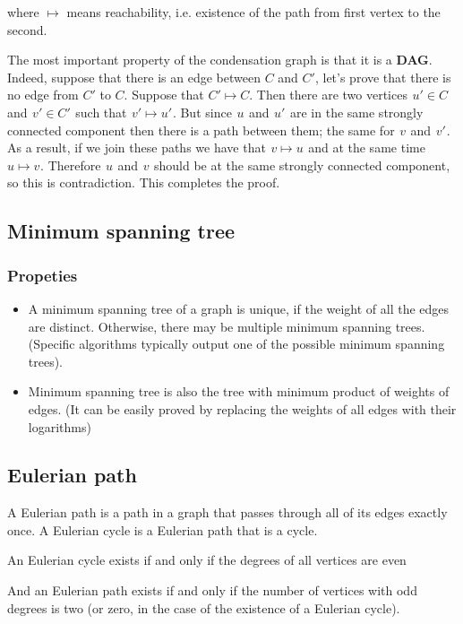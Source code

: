where $\mapsto$ means reachability, i.e. existence of the path from first vertex to the second.

The most important property of the condensation graph is that it is a \textbf{DAG}. Indeed, suppose that there is an edge between $C$ and $C'$, let's prove that there is no edge from $C'$ to $C$. Suppose that $C' \mapsto C$. Then there are two vertices  $u' \in C$  and  $v' \in C'$  such that  $v' \mapsto u'$ . But since  $u$  and  $u'$  are in the same strongly connected component then there is a path between them; the same for  $v$  and  $v'$ . As a result, if we join these paths we have that  $v \mapsto u$  and at the same time  $u \mapsto v$ . Therefore  $u$  and  $v$  should be at the same strongly connected component, so this is contradiction. This completes the proof.

\subsection{Minimum spanning tree}

\subsubsection{Propeties}

\begin{itemize}
    \item A minimum spanning tree of a graph is unique, if the weight of all the edges are distinct. Otherwise, there may be multiple minimum spanning trees. (Specific algorithms typically output one of the possible minimum spanning trees).

    \item Minimum spanning tree is also the tree with minimum product of weights of edges. (It can be easily proved by replacing the weights of all edges with their logarithms)
\end{itemize}

\subsection{Eulerian path}

A Eulerian path is a path in a graph that passes through all of its edges exactly once. A Eulerian cycle is a Eulerian path that is a cycle.

An Eulerian cycle exists if and only if the degrees of all vertices are even

And an Eulerian path exists if and only if the number of vertices with odd degrees is two (or zero, in the case of the existence of a Eulerian cycle).

